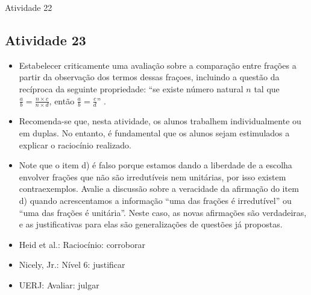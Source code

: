 \begin{multicols}{2}
\begin{resposta*}{Atividade 22}
\end{resposta*}


\subsection{Atividade 23}

\begin{itemize} %
  \item     Estabelecer criticamente uma avaliação sobre a comparação entre 
frações a partir da observação dos termos dessas fraçoes, incluindo a questão da 
recíproca da seguinte propriedade:     ``se existe número natural $n$ tal que 
$\frac{a}{b} = \frac{n \times c}{n \times d}$, então $\frac{a}{b} = 
\frac{c}{d}$''    . 
\end{itemize} %


\begin{itemize} %
  \item     Recomenda-se que, nesta atividade, os alunos trabalhem 
individualmente ou em duplas. No entanto, é fundamental que os alunos sejam 
estimulados a explicar o raciocínio realizado.
  \item     Note que o item d) é falso porque estamos dando a liberdade de a 
escolha envolver frações que não são irredutíveis nem unitárias, por isso 
existem contraexemplos. Avalie a discussão sobre a veracidade da afirmação do 
item d) quando acrescentamos a informação ``uma das frações é irredutível'' ou 
``uma das frações é unitária''. Neste caso, as novas afirmações são verdadeiras, 
e as justificativas para elas são generalizações de questões já propostas.
\end{itemize} %

 \vspace{.1cm}
  
 \vspace{.1cm}
 
\begin{itemize} %
  \item Heid et al.: Raciocínio: corroborar
  \item Nicely, Jr.: Nível 6: justificar
  \item UERJ: Avaliar: julgar
\end{itemize}



\end{multicols}
